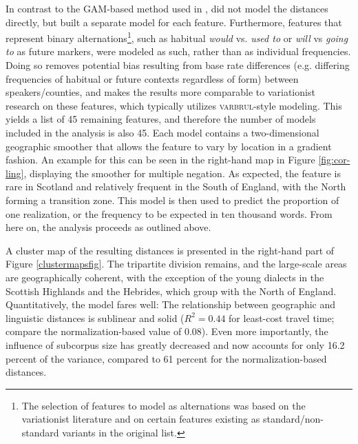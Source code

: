 \documentclass[output=paper]{LSP/langsci}
\begin{document}
In contrast to the GAM-based method used in \citet{wieling_quantitative_2012}, \citet{wolk_integrating_2014} did not model the distances directly, but built a separate model for each feature.
Furthermore, features that represent binary alternations\footnote{The selection of features to model as alternations was based on the variationist literature and on certain features existing as standard/non-standard variants in the original list.}, such as habitual \emph{would} vs. \emph{used to} or \emph{will} vs \emph{going to} as future markers, were modeled as such, rather than as individual frequencies.
Doing so removes potential bias resulting from base rate differences (e.g. differing frequencies of habitual or future contexts regardless of form) between speakers/counties, and makes the results more comparable to variationist research on these features, which typically utilizes \textsc{varbrul}-style modeling.
This yields a list of 45 remaining features, and therefore the number of models included in the analysis is also 45.
Each model contains a two-dimensional geographic smoother that allows the feature to vary by location in a gradient fashion.
An example for this can be seen in the right-hand map in Figure \ref{fig:cor-ling}, displaying the smoother for multiple negation.
As expected, the feature is rare in Scotland and relatively frequent in the South of England, with the North forming a transition zone.
This model is then used to predict the proportion of one realization, or the frequency to be expected in ten thousand words.
From here on, the analysis proceeds as outlined above.

A cluster map of the resulting distances is presented in the right-hand part of Figure \ref{clustermapsfig}. 
The tripartite division remains, and the large-scale areas are geographically coherent, with the exception of the young dialects in the Scottish Highlands and the Hebrides, which group with the North of England.
Quantitatively, the model fares well: The relationship between geographic and linguistic distances is sublinear and solid ($R^2 = 0.44$ for least-cost travel time; compare the normalization-based value of $0.08$).
Even more importantly, the influence of subcorpus size has greatly decreased and now accounts for only 16.2 percent of the variance, compared to 61 percent for the normalization-based distances.
\end{document}
